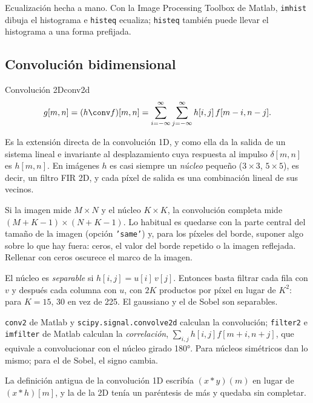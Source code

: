 \documentclass[11pt,a4paper]{scrartcl}
\begin{document}
\begin{encodigo}
  Ecualización hecha a mano. Con la Image Processing Toolbox de Matlab, \texttt{imhist} dibuja el histograma e \texttt{histeq} ecualiza; \texttt{histeq} también puede llevar el histograma a una forma prefijada.
\end{encodigo}

\subsection{Convolución bidimensional}

\begin{definicion}{Convolución 2D}{conv2d}
  \[
    g[m,n]=(h\conv f)[m,n]=\sum_{i=-\infty}^{\infty}\sum_{j=-\infty}^{\infty}h[i,j]\,f[m-i,n-j].
  \]
\end{definicion}

Es la extensión directa de la convolución 1D, y como ella da la salida de un sistema lineal e invariante al desplazamiento cuya respuesta al impulso $\delta[m,n]$ es $h[m,n]$. En imágenes $h$ es casi siempre un \emph{núcleo} pequeño ($3\times3$, $5\times5$), es decir, un filtro FIR 2D, y cada píxel de salida es una combinación lineal de sus vecinos.

Si la imagen mide $M\times N$ y el núcleo $K\times K$, la convolución completa mide $(M+K-1)\times(N+K-1)$. Lo habitual es quedarse con la parte central del tamaño de la imagen (opción \texttt{'same'}) y, para los píxeles del borde, suponer algo sobre lo que hay fuera: ceros, el valor del borde repetido o la imagen reflejada. Rellenar con ceros oscurece el marco de la imagen.

El núcleo es \emph{separable} si $h[i,j]=u[i]\,v[j]$. Entonces basta filtrar cada fila con $v$ y después cada columna con $u$, con $2K$ productos por píxel en lugar de $K^2$: para $K=15$, 30 en vez de 225. El gaussiano y el de Sobel son separables.

\begin{nota}
  \texttt{conv2} de Matlab y \texttt{scipy.signal.convolve2d} calculan la convolución; \texttt{filter2} e \texttt{imfilter} de Matlab calculan la \emph{correlación}, $\sum_{i,j}h[i,j]f[m+i,n+j]$, que equivale a convolucionar con el núcleo girado 180°. Para núcleos simétricos dan lo mismo; para el de Sobel, el signo cambia.
\end{nota}

\begin{errata}
  La definición antigua de la convolución 1D escribía $(x*y)(m)$ en lugar de $(x*h)[m]$, y la de la 2D tenía un paréntesis de más y quedaba sin completar.
\end{errata}
\end{document}
